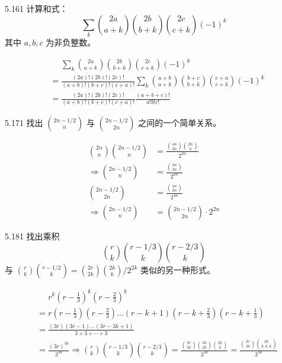 \begin{problem}{5.16}{1}
  计算和式：
  \[
    \sum_k \binom{2a}{a+k} \binom{2b}{b+k} \binom{2c}{c+k} (-1)^k
  \]
  其中 \( a, b, c \) 为非负整数。
\end{problem}

\begin{align*}
  &\phantom{=} \sum_k \binom{2a}{a+k} \binom{2b}{b+k} \binom{2c}{c+k} (-1)^k \\
  &= \frac{(2a)! (2b)! (2c)!}{(a+b)! (b+c)! (c+a)!} \sum_k \binom{a+b}{a+k} \binom{b+c}{b+k} \binom{c+a}{c+k} (-1)^k \\
  &= \frac{(2a)! (2b)! (2c)!}{(a+b)! (b+c)! (c+a)!} \frac{(a+b+c)!}{a! b! c!}
\end{align*}

\begin{problem}{5.17}{1}
  找出 \( \binom{2n-1/2}{n} \) 与 \( \binom{2n-1/2}{2n} \) 之间的一个简单关系。
\end{problem}

\begin{align*}
  \binom{2n}{n} \binom{2n - 1/2}{n} &= \frac{\binom{4n}{2n} \binom{2n}{n}}{2^{2n}} \\
  \Rightarrow
  \binom{2n - 1/2}{n} &= \frac{\binom{4n}{2n}}{2^{2n}} \\[6pt]
  \binom{2n-1/2}{2n} &= \frac{\binom{4n}{2n}}{2^{4n}} \\[6pt]
  \Rightarrow
  \binom{2n-1/2}{n} &= \binom{2n-1/2}{2n} \cdot 2^{2n}
\end{align*}

\begin{problem}{5.18}{1}
  找出乘积
  \[
    \binom{r}{k} \binom{r-1/3}{k} \binom{r-2/3}{k}
  \]
  与 \( \binom{r}{k} \binom{r-1/2}{k} = \binom{2r}{2k} \binom{2k}{k} / 2^{2k} \) 类似的另一种形式。
\end{problem}

\begin{align*}
  &\phantom{=} r^{\underline{k}} (r - \frac{1}{3})^{\underline{k}} (r - \frac{2}{3})^{\underline{k}} \\
  &= r (r-\frac{1}{3}) (r-\frac{2}{3}) \dots (r-k+1) (r-k+\frac{2}{3}) (r-k+\frac{1}{3}) \\
  &= \frac{(3r)(3r-1) \dots (3r-3k+1)}{3 \times 3 \times \cdots \times 3} \\
  &= \frac{(3r)^{\underline{3k}}}{3^{3k}}
  \Rightarrow
  \binom{r}{k} \binom{r-1/3}{k} \binom{r-2/3}{k} = \frac{\binom{3r}{3k} \binom{3k}{2k} \binom{2k}{k}}{3^{3k}} = \frac{\binom{3r}{3k} \binom{3k}{k,k,k}}{3^{3k}}
\end{align*}

